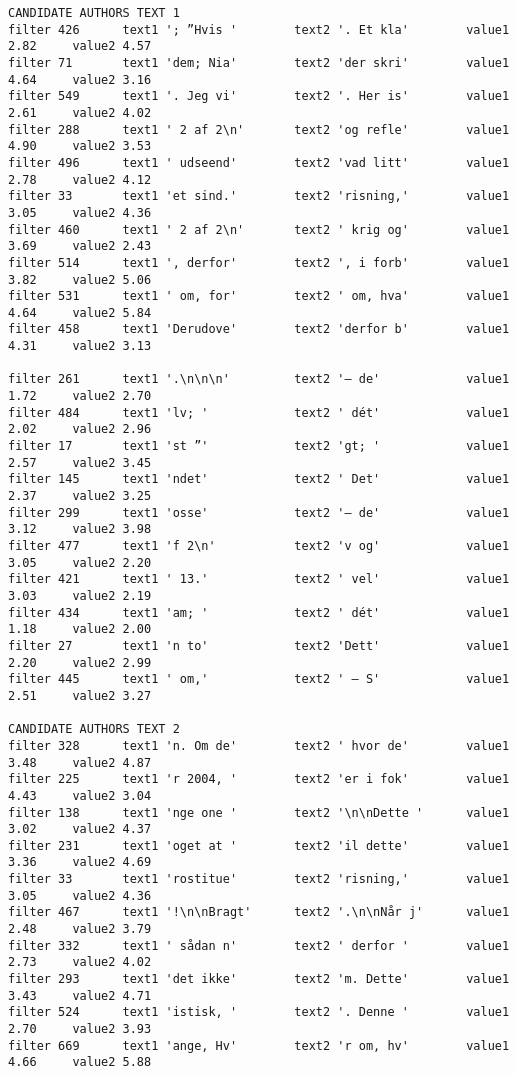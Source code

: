 {
\small
\begin{verbatim}
CANDIDATE AUTHORS TEXT 1
filter 426      text1 '; ”Hvis '        text2 '. Et kla'        value1 2.82     value2 4.57
filter 71       text1 'dem; Nia'        text2 'der skri'        value1 4.64     value2 3.16
filter 549      text1 '. Jeg vi'        text2 '. Her is'        value1 2.61     value2 4.02
filter 288      text1 ' 2 af 2\n'       text2 'og refle'        value1 4.90     value2 3.53
filter 496      text1 ' udseend'        text2 'vad litt'        value1 2.78     value2 4.12
filter 33       text1 'et sind.'        text2 'risning,'        value1 3.05     value2 4.36
filter 460      text1 ' 2 af 2\n'       text2 ' krig og'        value1 3.69     value2 2.43
filter 514      text1 ', derfor'        text2 ', i forb'        value1 3.82     value2 5.06
filter 531      text1 ' om, for'        text2 ' om, hva'        value1 4.64     value2 5.84
filter 458      text1 'Derudove'        text2 'derfor b'        value1 4.31     value2 3.13

filter 261      text1 '.\n\n\n'         text2 '– de'            value1 1.72     value2 2.70
filter 484      text1 'lv; '            text2 ' dét'            value1 2.02     value2 2.96
filter 17       text1 'st ”'            text2 'gt; '            value1 2.57     value2 3.45
filter 145      text1 'ndet'            text2 ' Det'            value1 2.37     value2 3.25
filter 299      text1 'osse'            text2 '– de'            value1 3.12     value2 3.98
filter 477      text1 'f 2\n'           text2 'v og'            value1 3.05     value2 2.20
filter 421      text1 ' 13.'            text2 ' vel'            value1 3.03     value2 2.19
filter 434      text1 'am; '            text2 ' dét'            value1 1.18     value2 2.00
filter 27       text1 'n to'            text2 'Dett'            value1 2.20     value2 2.99
filter 445      text1 ' om,'            text2 ' – S'            value1 2.51     value2 3.27

CANDIDATE AUTHORS TEXT 2
filter 328      text1 'n. Om de'        text2 ' hvor de'        value1 3.48     value2 4.87
filter 225      text1 'r 2004, '        text2 'er i fok'        value1 4.43     value2 3.04
filter 138      text1 'nge one '        text2 '\n\nDette '      value1 3.02     value2 4.37
filter 231      text1 'oget at '        text2 'il dette'        value1 3.36     value2 4.69
filter 33       text1 'rostitue'        text2 'risning,'        value1 3.05     value2 4.36
filter 467      text1 '!\n\nBragt'      text2 '.\n\nNår j'      value1 2.48     value2 3.79
filter 332      text1 ' sådan n'        text2 ' derfor '        value1 2.73     value2 4.02
filter 293      text1 'det ikke'        text2 'm. Dette'        value1 3.43     value2 4.71
filter 524      text1 'istisk, '        text2 '. Denne '        value1 2.70     value2 3.93
filter 669      text1 'ange, Hv'        text2 'r om, hv'        value1 4.66     value2 5.88


\end{verbatim}}
